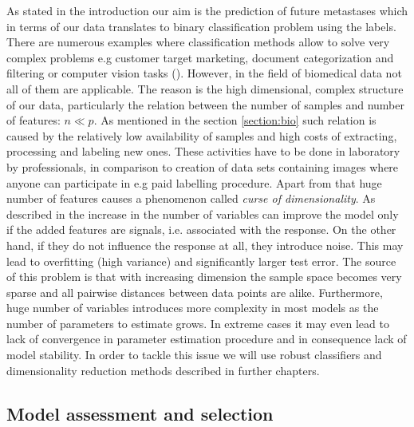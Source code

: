 \documentclass[12pt, wide]{mwart}
\begin{document}
As stated in the introduction our aim is the prediction of future metastases which in terms of our data translates to binary classification problem using the labels. There are numerous examples where classification methods allow to solve very complex problems e.g customer target marketing, document categorization and filtering or computer vision tasks (\cite{dataClassification}). However, in the field of biomedical data not all of them are applicable. The reason is the high dimensional, complex structure of our data, particularly the relation between the number of samples and number of features: $n \ll p$. As mentioned in the section \ref{section:bio} such relation is caused by the relatively low availability of samples and high costs of extracting, processing and labeling new ones. These activities have to be done in laboratory by professionals, in comparison to creation of data sets containing images where anyone can participate in e.g paid labelling procedure. Apart from that huge number of features causes a phenomenon called \textit{curse of dimensionality}. As described in \cite[chapter 6.4.3]{ISL} the increase in the number of variables can improve the model only if the added features are signals, i.e. associated with the response. On the other hand, if they do not influence the response at all, they introduce noise. This may lead to overfitting (high variance) and significantly larger test error. The source of this problem is that with increasing dimension the sample space becomes very sparse and all pairwise distances between data points are alike. Furthermore, huge number of variables introduces more complexity in most models as the number of parameters to estimate grows. In extreme cases it may even lead to lack of convergence in parameter estimation procedure and in consequence lack of model stability. In order to tackle this issue we will use robust classifiers and dimensionality reduction methods described in further chapters.

\subsection{Model assessment and selection} \label{section:selection}
\end{document}

